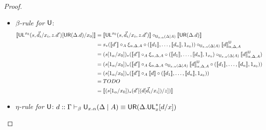 \begin{proof}
\begin{itemize}
\item \emph{$\beta$-rule for $\mathsf{U}$}: 
\begin{align*}
\llbracket \mathsf{UL}^{x_0}_{}(s,\vec{d_i}/x_i,z.d')[\mathsf{UR}(\Delta.d)/x_0] \rrbracket 
&= \llbracket \mathsf{UL}^{x_0}_{}(s,\vec{d_i}/x_i,z.d') \rrbracket \circ_{\mathsf{U}_{x.\alpha}(\Delta \mid A)} \llbracket \mathsf{UR}(\Delta.d) \rrbracket\\
&= s_*(\llbracket d' \rrbracket \circ_A \xi_{\alpha, \Delta,A} \circ (\llbracket d_1 \rrbracket, \dots, \llbracket d_n \rrbracket, 1_{x_0})) \circ_{\mathsf{U}_{x.\alpha}(\Delta \mid A)} {\llbracket d \rrbracket}^{\mathsf{U}}_{{\alpha},{\Delta},{A}}\\
&= (s[1_{\alpha}/x_0])_*(\llbracket d' \rrbracket \circ_A \xi_{\alpha, \Delta,A} \circ (\llbracket d_1 \rrbracket, \dots, \llbracket d_n \rrbracket, 1_{x_0}) \circ_{\mathsf{U}_{x.\alpha}(\Delta \mid A)} {\llbracket d \rrbracket}^{\mathsf{U}}_{{\alpha},{\Delta},{A}})\\
&= (s[1_{\alpha}/x_0])_*(\llbracket d' \rrbracket \circ_A \xi_{\alpha, \Delta,A} \circ_{\mathsf{U}_{x.\alpha}(\Delta \mid A)} {\llbracket d \rrbracket}^{\mathsf{U}}_{{\alpha},{\Delta},{A}} \circ (\llbracket d_1 \rrbracket, \dots, \llbracket d_n \rrbracket, 1_{x_0}) )\\
&= (s[1_{\alpha}/x_0])_*(\llbracket d' \rrbracket \circ_A \llbracket d \rrbracket \circ (\llbracket d_1 \rrbracket, \dots, \llbracket d_n \rrbracket, 1_{x_0}) )\\
&= TODO \\
&= \llbracket (s[1_{\alpha}/{x_0}])_*(d'[(d[{\vec{d_i}/x_i}])/z]) \rrbracket
\end{align*}

\item \emph{$\eta$-rule for $\mathsf{U}$}: $d :: \Gamma \vdash_{\beta} \mathsf{U}_{x.\alpha}(\Delta \mid A)  \equiv  \mathsf{UR}(\Delta.\mathsf{UL}^*_{x}[d/x])$
\end{itemize}
\end{proof}

